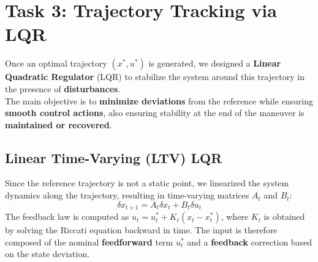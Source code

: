 
\section{Task 3: Trajectory Tracking via LQR}

Once an optimal trajectory $(x^*, u^*)$ is generated, we designed a \textbf{Linear Quadratic Regulator} (LQR) to stabilize the system around this trajectory in the presence of \textbf{disturbances}.\\
The main objective is to \textbf{minimize deviations} from the reference while ensuring \textbf{smooth control actions}, also ensuring stability at the end of the maneuver is \textbf{maintained or recovered}.

\subsection{Linear Time-Varying (LTV) LQR}
Since the reference trajectory is not a static point, we linearized the system dynamics along the trajectory, resulting in time-varying matrices $A_t$ and $B_t$:
\begin{equation}
\delta x_{t+1} = A_t \delta x_t + B_t \delta u_t
\end{equation}
The feedback law is computed as $u_t = u^*_t + K_t (x_t - x^*_t)$, where $K_t$ is obtained by solving the Riccati equation backward in time.
The input is therefore composed of the nominal \textbf{feedforward} term $u^*_t$ and a \textbf{feedback} correction based on the state deviation.

